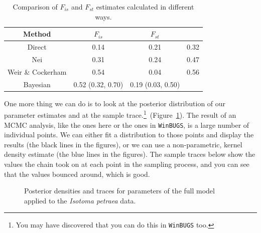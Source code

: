 \begin{table}
\begin{center}
\begin{tabular}{c|ccc}
\hline\hline
Method & $F_{is}$ & $F_{st}$ \\
\hline
Direct            & 0.14 & 0.21 & 0.32 \\
Nei               & 0.31 & 0.24 & 0.47 \\
Weir \& Cockerham & 0.54 & 0.04 & 0.56 \\
Bayesian          & 0.52 (0.32, 0.70) & 0.19 (0.03, 0.50) \\
\hline
\end{tabular}
\end{center}
\caption{Comparison of $F_{is}$ and $F_{st}$ estimates calculated in
  different ways.}\label{table:compare}
\end{table}

One more thing we can do is to look at the posterior distribution of
our parameter estimates and at the sample trace.\footnote{You may have
  discovered that you can do this in {\tt WinBUGS}
  too.}~(Figure~\ref{fig:james}). The result of an MCMC analysis, like
the ones here or the ones in {\tt WinBUGS}, is a large number of
individual points. We can either fit a distribution to those points
and display the results (the black lines in the figures), or we can
use a non-parametric, kernel density estimate (the blue lines in the
figures). The sample traces below show the values the chain took on at
each point in the sampling process, and you can see that the values
bounced around, which is good.

\begin{figure}
\caption{Posterior densities and traces for parameters of the full
  model applied to the {\it Isotoma petraea} data.}\label{fig:james}
\end{figure}

